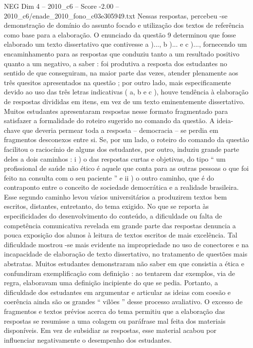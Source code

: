 \begin{textsample}{NEG Dim 4 – 2010\_c6 – Score -2.00 – 2010\_c6/enade\_2010\_fono\_c03e305949.txt}
Nessas respostas, percebeu -se demonstração de domínio do assunto focado e utilização dos textos de referência como base para a elaboração.
O enunciado da questão 9 determinou que fosse elaborado um texto dissertativo que contivesse a )..., b )... e c )..., fornecendo um encaminhamento para as respostas que conduziu tanto a um resultado positivo quanto a um negativo, a saber : foi produtiva a resposta dos estudantes no sentido de que conseguiram, na maior parte das vezes, atender plenamente aos três quesitos apresentados na questão ; por outro lado, mais especificamente devido ao uso das três letras indicativas ( a, b e c ), houve tendência à elaboração de respostas divididas em itens, em vez de um texto eminentemente dissertativo.
Muitos estudantes apresentaram respostas nesse formato fragmentado para satisfazer a formalidade do roteiro sugerido no comando da questão.
A ideia-chave que deveria permear toda a resposta – democracia – se perdia em fragmentos desconexos entre si.
Se, por um lado, o roteiro do comando da questão facilitou o raciocínio de alguns dos estudantes, por outro, induziu grande parte deles a dois caminhos : i ) o das respostas curtas e objetivas, do tipo “ um profissional de saúde não ético é aquele que conta para as outras pessoas o que foi feito na consulta com o seu paciente ” e ii ) o outro caminho, que é do contraponto entre o conceito de sociedade democrática e a realidade brasileira.
Esse segundo caminho levou vários universitários a produzirem textos bem escritos, distantes, entretanto, do tema exigido.
No que se reporta às especificidades do desenvolvimento do conteúdo, a dificuldade ou falta de competência comunicativa revelada em grande parte das respostas denuncia a pouca exposição dos alunos à leitura de textos escritos de mais excelência.
Tal dificuldade mostrou -se mais evidente na impropriedade no uso de conectores e na incapacidade de elaboração de texto dissertativo, no tratamento de questões mais abstratas.
Muitos estudantes demonstraram não saber em que consistia a ética e confundiram exemplificação com definição : ao tentarem dar exemplos, via de regra, elaboravam uma definição incipiente do que se pedia.
Portanto, a dificuldade dos estudantes em argumentar e articular as ideias com coesão e coerência ainda são os grandes “ vilões ” desse processo avaliativo.
O excesso de fragmentos e textos prévios acerca do tema permitiu que a elaboração das respostas se resumisse a uma colagem ou paráfrase mal feita dos materiais disponíveis.
Em vez de subsidiar as respostas, esse material acabou por influenciar negativamente o desempenho dos estudantes.

\end{textsample}
